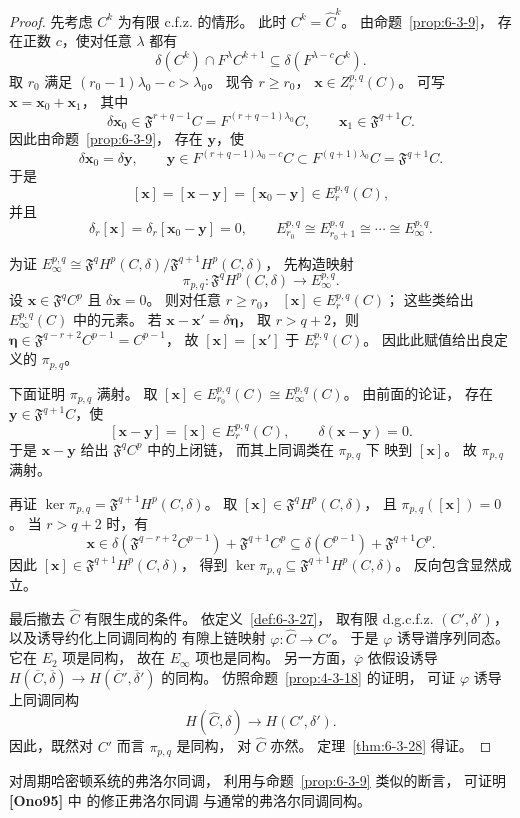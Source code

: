 \begin{proof}
先考虑 $C^k$ 为有限 c.f.z. 的情形。
此时 $C^k=\widehat C^k$。
由命题~\ref{prop:6-3-9}，
存在正数 $c$，使对任意 $\lambda$ 都有
\[
\delta(C^k)\cap F^\lambda C^{k+1}
\subseteq\delta(F^{\lambda-c}C^k).
\]
取 $r_0$ 满足
$(r_0-1)\lambda_0-c>\lambda_0$。
现令 $r\ge r_0$，
$\mathbf x\in Z_r^{p,q}(C)$。
可写 $\mathbf x=\mathbf x_0+\mathbf x_1$，
其中
\[
\delta\mathbf x_0
\in\mathfrak F^{r+q-1}C
=F^{(r+q-1)\lambda_0}C,
\qquad
\mathbf x_1\in\mathfrak F^{q+1}C.
\]
因此由命题~\ref{prop:6-3-9}，
存在 $\mathbf y$，使
\[
\delta\mathbf x_0=\delta\mathbf y,
\qquad
\mathbf y\in
F^{(r+q-1)\lambda_0-c}C
\subset F^{(q+1)\lambda_0}C
=\mathfrak F^{q+1}C.
\]
于是
\[
[\mathbf x]
=[\mathbf x-\mathbf y]
=[\mathbf x_0-\mathbf y]
\in E_r^{p,q}(C),
\]
并且
\[
\delta_r[\mathbf x]
=\delta_r[\mathbf x_0-\mathbf y]=0,
\qquad
E_{r_0}^{p,q}\cong E_{r_0+1}^{p,q}
\cong\cdots\cong E_\infty^{p,q}.
\]

为证
$E_\infty^{p,q}
\cong\mathfrak F^qH^p(C,\delta)
/\mathfrak F^{q+1}H^p(C,\delta)$，
先构造映射
\[
\pi_{p,q}:
\mathfrak F^qH^p(C,\delta)
\longrightarrow E_\infty^{p,q}.
\]
设 $\mathbf x\in\mathfrak F^q C^p$
且 $\delta\mathbf x=0$。
则对任意 $r\ge r_0$，
$[\mathbf x]\in E_r^{p,q}(C)$；
这些类给出 $E_\infty^{p,q}(C)$
中的元素。
若 $\mathbf x-\mathbf x'=\delta\boldsymbol\eta$，
取 $r>q+2$，则
$\boldsymbol\eta\in
\mathfrak F^{q-r+2}C^{p-1}=C^{p-1}$，
故 $[\mathbf x]=[\mathbf x']$
于 $E_r^{p,q}(C)$。
因此此赋值给出良定义的 $\pi_{p,q}$。

下面证明 $\pi_{p,q}$ 满射。
取
$[\mathbf x]\in E_{r_0}^{p,q}(C)
\cong E_\infty^{p,q}(C)$。
由前面的论证，
存在 $\mathbf y\in\mathfrak F^{q+1}C$，使
\[
[\mathbf x-\mathbf y]
=[\mathbf x]\in E_r^{p,q}(C),
\qquad
\delta(\mathbf x-\mathbf y)=0.
\]
于是 $\mathbf x-\mathbf y$
给出 $\mathfrak F^qC^p$
中的上闭链，
而其上同调类在 $\pi_{p,q}$ 下
映到 $[\mathbf x]$。
故 $\pi_{p,q}$ 满射。

再证
$\ker\pi_{p,q}
=\mathfrak F^{q+1}H^p(C,\delta)$。
取 $[\mathbf x]\in
\mathfrak F^qH^p(C,\delta)$，
且 $\pi_{p,q}([\mathbf x])=0$。
当 $r>q+2$ 时，有
\[
\mathbf x\in
\delta(\mathfrak F^{q-r+2}C^{p-1})
+\mathfrak F^{q+1}C^p
\subseteq
\delta(C^{p-1})+\mathfrak F^{q+1}C^p.
\]
因此
$[\mathbf x]\in\mathfrak F^{q+1}H^p(C,\delta)$，
得到
$\ker\pi_{p,q}\subseteq
\mathfrak F^{q+1}H^p(C,\delta)$。
反向包含显然成立。

最后撤去 $\widehat C$ 有限生成的条件。
依定义~\ref{def:6-3-27}，
取有限 d.g.c.f.z.
$(C',\delta')$，
以及诱导约化上同调同构的
有隙上链映射
$\varphi:\widehat C\to C'$。
于是 $\varphi$ 诱导谱序列同态。
它在 $E_2$ 项是同构，
故在 $E_\infty$ 项也是同构。
另一方面，$\overline\varphi$
依假设诱导
$H(\overline C,\overline\delta)
\to H(\overline C',\overline\delta')$
的同构。
仿照命题~\ref{prop:4-3-18} 的证明，
可证 $\varphi$ 诱导上同调同构
\[
H(\widehat C,\delta)
\longrightarrow H(C',\delta').
\]
因此，既然对 $C'$ 而言
$\pi_{p,q}$ 是同构，
对 $\widehat C$ 亦然。
定理~\ref{thm:6-3-28} 得证。
\end{proof}

对周期哈密顿系统的弗洛尔同调，
利用与命题~\ref{prop:6-3-9}
类似的断言，
可证明 \textbf{[Ono95]} 中
的修正弗洛尔同调
与通常的弗洛尔同调同构。
